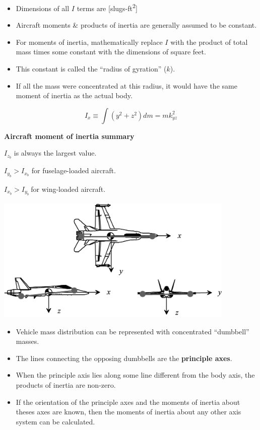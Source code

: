 \documentclass[
]{book}
\providecommand{\tightlist}{%
  \setlength{\itemsep}{0pt}\setlength{\parskip}{0pt}}
\begin{document}
\begin{itemize}
\tightlist
\item
  Dimensions of all \(I\) terms are {[}slugs-ft\textsuperscript{2}{]}
\item
  Aircraft moments \& products of inertia are generally assumed to be constant.
\item
  For moments of inertia, mathematically replace \(I\) with the product of total mass times some constant with the dimensions of square feet.
\item
  This constant is called the ``radius of gyration'' (\(k\)).
\item
  If all the mass were concentrated at this radius, it would have the same moment of inertia as the actual body.
\end{itemize}

\[ I_x \equiv \int \left( y^2 + z^2 \right) dm = mk^2_{yz} \]

\textbf{Aircraft moment of inertia summary}

\(I_{z_b}\) is always the largest value.

\(I_{y_b} > I_{x_b}\) for fuselage-loaded aircraft.

\(I_{x_b} > I_{y_b}\ \)for wing-loaded aircraft.

\includegraphics[width=4.5in,height=2.375in]{media/07/image19.svg}

\begin{itemize}
\tightlist
\item
  Vehicle mass distribution can be represented with concentrated ``dumbbell'' masses.
\item
  The lines connecting the opposing dumbbells are the \textbf{principle axes}.
\item
  When the principle axis lies along some line different from the body axis, the products of inertia are non-zero.
\item
  If the orientation of the principle axes and the moments of inertia about theses axes are known, then the moments of inertia about any other axis system can be calculated.
\end{itemize}
\end{document}
